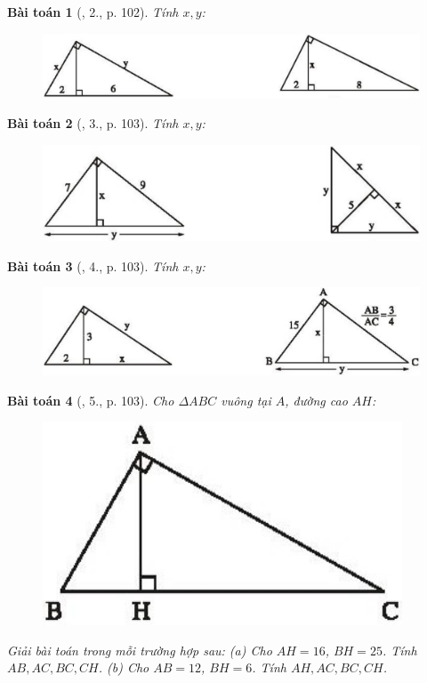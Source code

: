 \documentclass{article}
\newtheorem{baitoan}{Bài toán}
\begin{document}
\begin{baitoan}[\cite{SBT_Toan_9_tap_1}, 2., p. 102]
	Tính $x,y$:
	\begin{figure}[H]
		\centering
		\includegraphics[scale=.25]{SBT_Toan_9_2_p102}
	\end{figure}
\end{baitoan}

\begin{baitoan}[\cite{SBT_Toan_9_tap_1}, 3., p. 103]
	Tính $x,y$:
	\begin{figure}[H]
		\centering
		\includegraphics[scale=.25]{SBT_Toan_9_3_p103}
	\end{figure}
\end{baitoan}

\begin{baitoan}[\cite{SBT_Toan_9_tap_1}, 4., p. 103]
	Tính $x,y$:
	\begin{figure}[H]
		\centering
		\includegraphics[scale=.25]{SBT_Toan_9_4_p103}
	\end{figure}
\end{baitoan}

\begin{baitoan}[\cite{SBT_Toan_9_tap_1}, 5., p. 103]
	Cho $\Delta ABC$ vuông tại $A$, đường cao $AH$:
	\begin{figure}[H]
		\centering
		\includegraphics[scale=.25]{SBT_Toan_9_5_p103}
	\end{figure}
	\noindent Giải bài toán trong mỗi trường hợp sau: (a) Cho $AH = 16$, $BH = 25$. Tính $AB,AC,BC,CH$. (b) Cho $AB = 12$, $BH = 6$. Tính $AH,AC,BC,CH$.
\end{baitoan}
\end{document}
